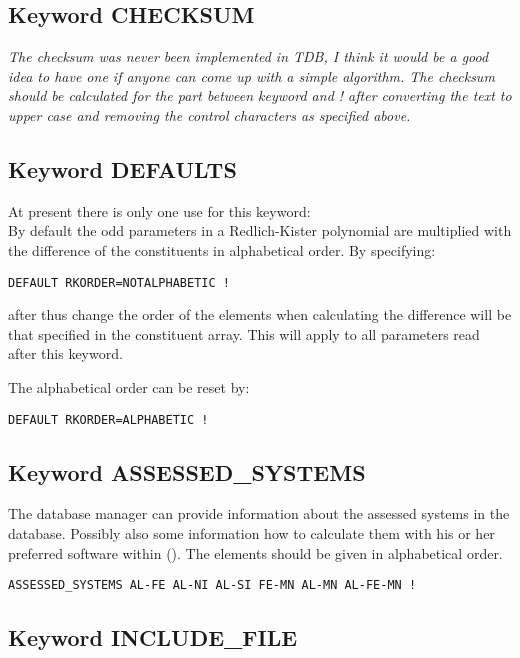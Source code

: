 \documentclass[12pt]{article}
\begin{document}
\subsection{Keyword CHECKSUM}

{\em The checksum was never been implemented in TDB, I think it would
  be a good idea to have one if anyone can come up with a simple
  algorithm.  The checksum should be calculated for the part between
  keyword and ! after converting the text to upper case and removing
  the control characters as specified above.}

\subsection{Keyword DEFAULTS}\label{sec:defaults}

At present there is only one use for this keyword:\\

By default the odd parameters in a Redlich-Kister polynomial are
multiplied with the difference of the constituents in alphabetical order.
By specifying:
\begin{verbatim}
DEFAULT RKORDER=NOTALPHABETIC !
\end{verbatim}
after thus change the order of the elements when calculating the
difference will be that specified in the constituent array.  This will
apply to all parameters read after this keyword.

The alphabetical order can be reset by:
\begin{verbatim}
DEFAULT RKORDER=ALPHABETIC !
\end{verbatim}

\subsection{Keyword ASSESSED\_SYSTEMS}\label{sec:assys}

The database manager can provide information about the assessed
systems in the database.  Possibly also some information how to
calculate them with his or her preferred software within ().  The
elements should be given in alphabetical order.

\begin{verbatim}
ASSESSED_SYSTEMS AL-FE AL-NI AL-SI FE-MN AL-MN AL-FE-MN !
\end{verbatim}


\subsection{Keyword INCLUDE\_FILE}
\end{document}
